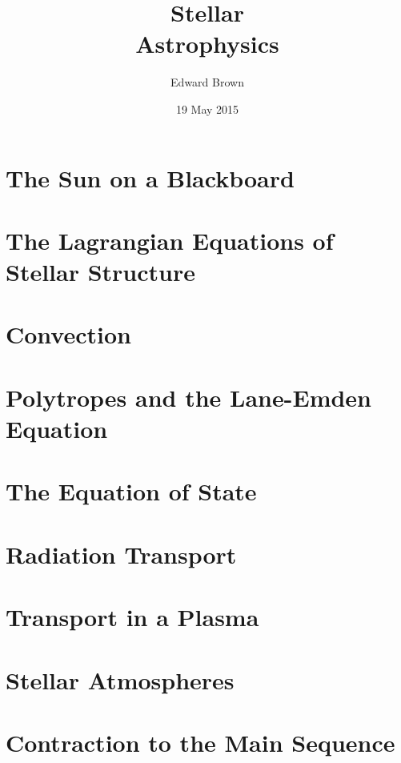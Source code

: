 \documentclass{astro-bookshelf}
\title{Stellar\\Astrophysics}
\author{Edward Brown}
\date{19 May 2015}
\begin{document}
\frontmatter
{}


\mainmatter
{}
\setcounter{page}{1}

\chapter{The Sun on a Blackboard}\label{ch.introduction}


\chapter[Equations of Stellar Structure]{The Lagrangian Equations of Stellar Structure}\label{ch.stellar-structure-eqn}


\chapter{Convection}\label{s.convection}


\chapter[Polytropes]{Polytropes and the Lane-Emden Equation}\label{ch.polytropes}


\chapter[Equation of State]{The Equation of State}\label{ch.equation-of-state}


\chapter{Radiation Transport}


\chapter{Transport in a Plasma}\label{ch.plasma-transport}


\chapter[Stellar Atmospheres]{Stellar Atmospheres}\label{s.stellar-atmospheres}


\chapter{Contraction to the Main Sequence}

\end{document}
